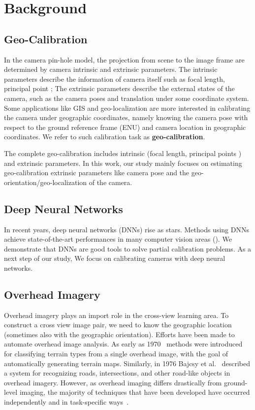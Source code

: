\section{Background}

\subsection{Geo-Calibration}
In the camera pin-hole model, the projection from scene to the image
frame are determined by camera intrinsic and extrinsic parameters. 
The intrinsic parameters describe the information of camera
itself such as focal length, principal point \etc; 
The extrinsic parameters describe the external states of the
camera, such as the camera poses and translation under some
coordinate system.
Some applications like GIS and geo-localization are more interested in
calibrating the camera under geographic coordinates, namely knowing
the camera pose with respect to the ground reference frame (\ie ENU)
and camera location in geographic coordinates. We refer to such
calibration task as \textbf{geo-calibration}.

The complete geo-calibration includes intrinsic (focal
length, principal points \etc) and extrinsic parameters.
In this work, our study mainly focuses on estimating geo-calibration
extrinsic parameters like camera pose and the
geo-orientation/geo-localization of the camera.

\subsection{Deep Neural Networks}
In recent years, deep neural networks (DNNs) rise as stars. Methods
using DNNs achieve state-of-the-art performances in
many computer vision areas (). We demonstrate that
DNNs are good tools to solve partial calibration problems. 
As a next step of our study, We focus on calibrating cameras with deep
neural networks.


\subsection{Overhead Imagery}
Overhead imagery plays an import role in the cross-view learning area.
To construct a cross view image pair, we need to know the geographic
location (sometimes also with the geographic orientation).
 Efforts have been made to
automate overhead image analysis. As early as
1970~\cite{idelsohn1970learning} methods were introduced for
classifying terrain types from a single overhead image, with the goal
of automatically generating terrain maps.  Similarly, in 1976 Bajcsy
et al.~\cite{bajcsy1976computer} described a system for recognizing
roads, intersections, and other road-like objects in overhead imagery.
However, as overhead imaging differs drastically from ground-level
imaging, the majority of techniques that have been developed have
occurred independently and in task-specific ways~\cite{Rozen}.

